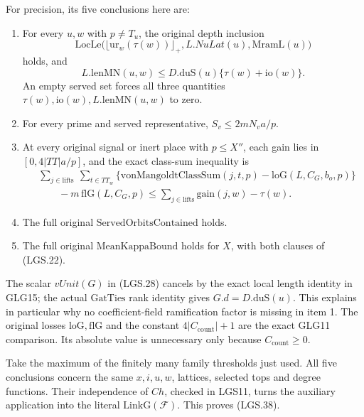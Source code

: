 For precision, its five conclusions here are:
\begin{enumerate}
\item For every \(u,w\) with \(p\ne T_u\), the original
depth inclusion
\[
 \mathrm{LocLe}\bigl(\lfloor\mathrm{ur}_w(\tau(w))\rfloor_+,
                          L.NuLat(u),\mathrm{MramL}(u)\bigr)
 \]
holds, and
\[
 L.\mathrm{lenMN}(u,w)
       \le D.\mathrm{duS}(u)\{\tau(w)+\mathrm{io}(w)\}.
 \]
An empty served set forces all three quantities
\(\tau(w),\mathrm{io}(w),L.\mathrm{lenMN}(u,w)\) to zero.
\item For every prime and served representative,
\(S_v\le2mN_va/p\).
\item At every original signal or inert place with
\(p\le X''\), each gain lies in
\([0,4|TT|a/p]\), and the exact class-sum inequality is
\[
 \begin{aligned}
 &\sum_{j\in\mathrm{lifts}}\ \sum_{t\in TT_w}
       \{\mathrm{vonMangoldtClassSum}(j,t,p)
                         -\mathrm{loG}(L,C_G,b_o,p)\}\\
 &\qquad-m\,\mathrm{flG}(L,C_G,p)
       \le\sum_{j\in\mathrm{lifts}}\mathrm{gain}(j,w)-\tau(w).
 \end{aligned}
 \]
\item The full original \(\mathrm{ServedOrbitsContained}\)
holds.
\item The full original \(\mathrm{MeanKappaBound}\)
holds for \(X\), with both clauses of (LGS.22).
\end{enumerate}
The scalar \(vUnit(G)\) in (LGS.28) cancels by the
exact local length identity in GLG15; the actual
\(\mathrm{GatTies}\) rank identity gives
\(G.d=D.\mathrm{duS}(u)\).
This explains in particular why no coefficient-field
ramification factor is missing in item 1.
The original losses \(\mathrm{loG},\mathrm{flG}\)
and the constant \(4|C_{\mathrm{count}}|+1\) are
the exact GLG11 comparison.  Its absolute value is
unnecessary only because \(C_{\mathrm{count}}\ge0\).

Take the maximum of the finitely many family thresholds
just used.  All five conclusions concern the same
\(x,i,u,w\), lattices, selected tops and degree functions.
Their independence of \(Ch\), checked in LGS11,
turns the auxiliary application into the literal
\(\mathrm{LinkG}(\mathcal F)\).  This proves (LGS.38).

